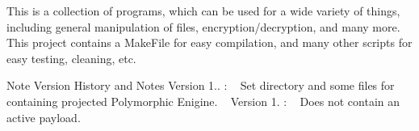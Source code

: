 This is a collection of programs, which can be used for a wide variety of things, including general manipulation of files, encryption/decryption, and many more. This project contains a Make\+File for easy compilation, and many other scripts for easy testing, cleaning, etc. \begin{DoxyNote}{Note}
Version History and Notes Version 1.. \+: ~\newline
 Set directory and some files for containing projected Polymorphic Enigine. ~\newline
 Version 1. \+: ~\newline
 Does not contain an active payload. ~\newline

\end{DoxyNote}
